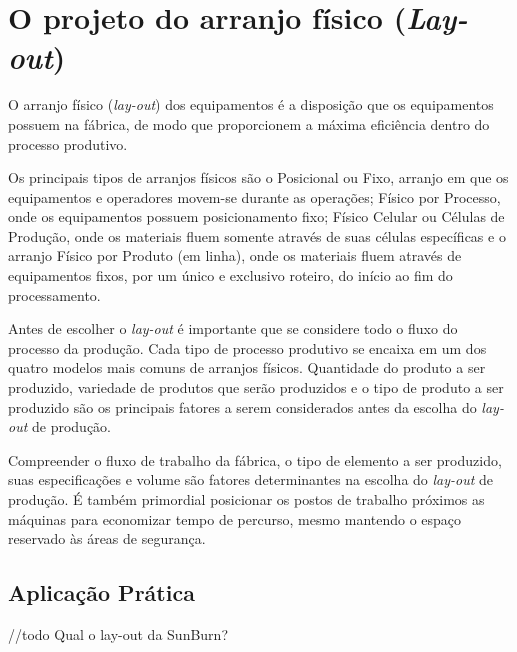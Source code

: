 \chapter{O projeto do arranjo físico (\textit{Lay-out})}
\label{chap:projeto_do_arranjo}
O arranjo físico (\textit{lay-out}) dos equipamentos é a disposição que os equipamentos possuem na fábrica, de modo que proporcionem a máxima eficiência dentro do processo produtivo.

Os principais tipos de arranjos físicos são o Posicional ou Fixo, arranjo em que os equipamentos e operadores movem-se durante as operações; Físico por Processo, onde os equipamentos possuem posicionamento fixo; Físico Celular ou Células de Produção, onde os materiais fluem somente através de suas células específicas e o arranjo Físico por Produto (em linha), onde os materiais fluem através de equipamentos fixos, por um único e exclusivo roteiro, do início ao fim do processamento.

Antes de escolher o \textit{lay-out} é importante que se considere todo o fluxo do processo da produção. Cada tipo de processo produtivo se encaixa em um dos quatro modelos mais comuns de arranjos físicos. Quantidade do produto a ser produzido, variedade de produtos que serão produzidos e o tipo de produto a ser produzido são os principais fatores a serem considerados antes da escolha do \textit{lay-out} de produção.

Compreender o fluxo de trabalho da fábrica, o tipo de elemento a ser produzido, suas especificações e volume são fatores determinantes na escolha do \textit{lay-out} de produção. É também primordial posicionar os postos de trabalho próximos as máquinas para economizar tempo de percurso, mesmo mantendo o espaço reservado às áreas de segurança.

\section{Aplicação Prática}
\label{sec:projeto_do_arranjo_aplicacao}

//todo Qual o lay-out da SunBurn?